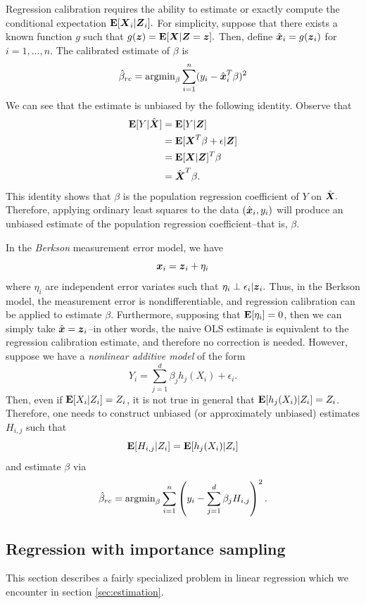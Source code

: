 \documentclass[12pt]{article}
\begin{document}
Regression calibration requires the ability to estimate or exactly
compute the conditional expectation $\textbf{E}[\boldsymbol{X}_i|\boldsymbol{Z}_i].$ For simplicity,
suppose that there exists a known function $g$ such that $g(\boldsymbol{z})
= \textbf{E}[\boldsymbol{X}|\boldsymbol{Z} = \boldsymbol{z}].$ Then, define $\hat{\boldsymbol{x}}_i = g(\boldsymbol{z}_i)$ for $i =
1,\hdots, n$.  The calibrated estimate of $\beta$ is
\begin{equation}\label{eq:rc}
\hat{\beta}_{rc} = \text{argmin}_\beta \sum_{i=1}^n (y_i - \hat{\boldsymbol{x}}_i^T \beta)^2
\end{equation}
We can see that the estimate is unbiased by the following identity.
Observe that
\begin{align*}
\textbf{E}[Y|\hat{\boldsymbol{X}}] &= \textbf{E}[Y|\boldsymbol{Z}]
\\&= \textbf{E}[\boldsymbol{X}^T \beta + \epsilon|\boldsymbol{Z}]
\\&= \textbf{E}[\boldsymbol{X}|\boldsymbol{Z}]^T \beta
\\&= \hat{\boldsymbol{X}}^T \beta.
\end{align*}
This identity shows that $\beta$ is the population regression
coefficient of $Y$ on $\hat{\boldsymbol{X}}.$ Therefore, applying ordinary least
squares to the data $(\hat{\boldsymbol{x}}_i, y_i)$ will produce an unbiased
estimate of the population regression coefficient--that is, $\beta.$

In the \emph{Berkson} measurement error model, we have
\[
\boldsymbol{x}_i = \boldsymbol{z}_i + \eta_i
\]
where $\eta_i$ are independent error variates such that
$\eta_i \perp \epsilon_i | \boldsymbol{z}_i.$ Thus, in the Berkson model, the
measurement error is nondifferentiable, and regression calibration can
be applied to estimate $\beta$.  Furthermore, supposing that
$\textbf{E}[\eta_i]=0$, then we can simply take $\hat{\boldsymbol{x}} = \boldsymbol{z}_i$--in other
words, the naive OLS estimate is equivalent to the regression
calibration estimate, and therefore no correction is needed.
However, suppose we have a \emph{nonlinear additive model} of the form
\[
Y_i = \sum_{j=1}^d \beta_j h_j(X_i) + \epsilon_i.
\]
Then, even if $\textbf{E}[X_i|Z_i] = Z_i$, it is not true in general that
$\textbf{E}[h_j(X_i)|Z_i] = Z_i$.  Therefore, one needs to construct unbiased
(or approximately unbiased) estimates $H_{i,j}$ such that
\[
\textbf{E}[H_{i,j}|Z_i] = \textbf{E}[h_j(X_i)|Z_i]
\]
and estimate $\beta$ via
\[
\hat{\beta}_{rc} = \text{argmin}_\beta \sum_{i=1}^n \left(y_i - \sum_{j=1}^d \beta_j H_{i, j} \right)^2.
\]

\subsection{Regression with importance sampling}

This section describes a fairly specialized problem in linear
regression which we encounter in section \ref{sec:estimation}.
\end{document}
